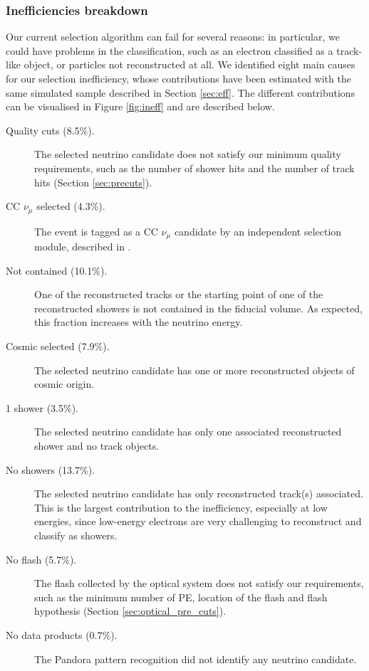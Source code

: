 \subsubsection{Inefficiencies breakdown}\label{sec:ineff}
Our current selection algorithm can fail for several reasons: in particular, we could have problems in the classification, such as an electron classified as a track-like object, or particles not reconstructed at all. We identified eight main causes for our selection inefficiency, whose contributions have been estimated with the same simulated sample described in Section \ref{sec:eff}. The different contributions can be visualised in Figure \ref{fig:ineff} and are described below.
\begin{description}

\item[Quality cuts (8.5\%).] The selected neutrino candidate does not satisfy our minimum quality requirements, such as the number of shower hits and the number of track hits (Section \ref{sec:precuts}).
\item[CC $\nu_{\mu}$ selected (4.3\%).] The event is tagged as a CC $\nu_{\mu}$ candidate by an independent selection module, described in \cite{ubxsec}. 
\item[Not contained (10.1\%).] One of the reconstructed tracks or the starting point of one of the reconstructed showers is not contained in the fiducial volume. As expected, this fraction increases with the neutrino energy.
\item[Cosmic selected (7.9\%).] The selected neutrino candidate has one or more reconstructed objects of cosmic origin.
\item[1 shower (3.5\%).] The selected neutrino candidate has only one associated reconstructed shower and no track objects. 
\item[No showers (13.7\%).]  The selected neutrino candidate has only reconstructed track(s) associated. This is the largest contribution to the inefficiency, especially at low energies, since low-energy electrons are very challenging to reconstruct and classify as showers.
\item[No flash (5.7\%).]  The flash collected by the optical system does not satisfy our requirements, such as the minimum number of PE, location of the flash and flash hypothesis (Section \ref{sec:optical_pre_cuts}).
\item[No data products (0.7\%).] The Pandora pattern recognition did not identify any neutrino candidate.
\end{description}

